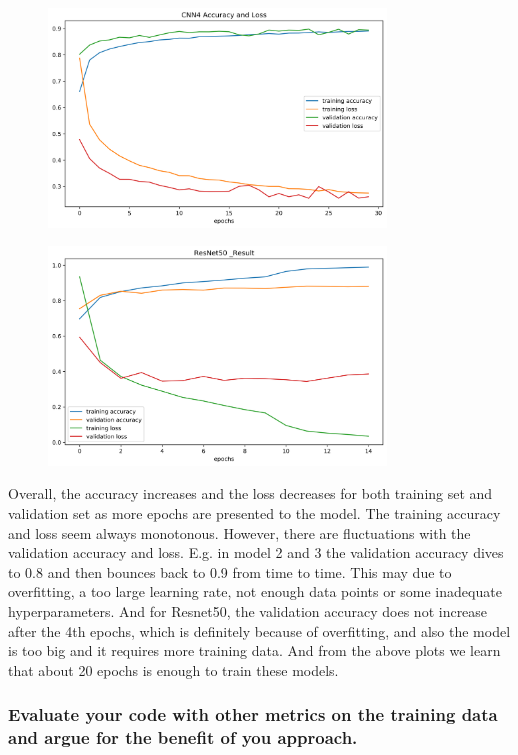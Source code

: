\documentclass[12pt]{article}
\begin{document}
\begin{figure}[H]
\begin{center}
    \includegraphics[width=0.8\textwidth]{./plots/CNN4_Result.png}
\end{center}
\end{figure}
\begin{figure}[H]
\begin{center}
    \includegraphics[width=0.8\textwidth]{./plots/Resnet50_Result.png}
\end{center}
\end{figure}
\vspace*{-1.0cm}

Overall, the accuracy increases and the loss decreases for both training set and validation set as more epochs are presented to the model. The training accuracy and loss seem always monotonous. However, there are fluctuations with the validation accuracy and loss. E.g. in model 2 and 3 the validation accuracy dives to 0.8 and then bounces back to 0.9 from time to time. This may due to overfitting, a too large learning rate, not enough data points or some inadequate hyperparameters. And for Resnet50, the validation accuracy does not increase after the 4th epochs, which is definitely because of overfitting, and also the model is too big and it requires more training data. And from the above plots we learn that about 20 epochs is enough to train these models.

\subsubsection{Evaluate your code with other metrics on the training data and argue for the benefit of you approach.}
\end{document}
